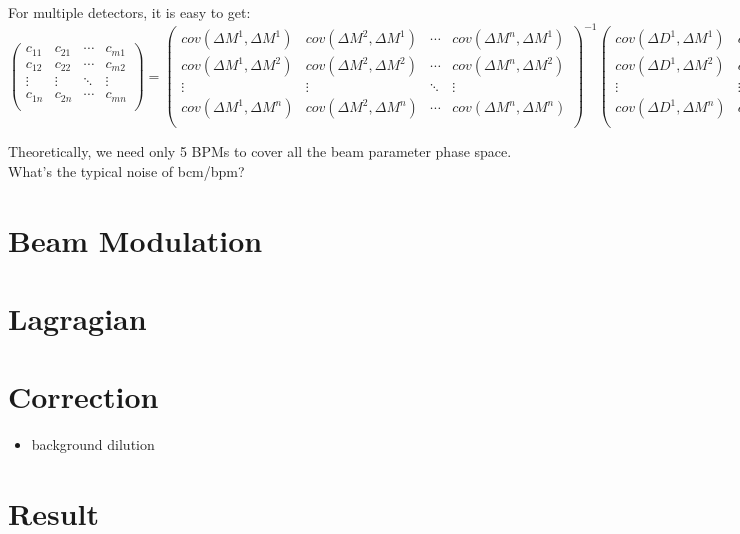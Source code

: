 For multiple detectors, it is easy to get:
\begin{equation}
    \begin{pmatrix}
	c_{11}	& c_{21}    & \cdots & c_{m1}	\\
	c_{12}	& c_{22}    & \cdots & c_{m2}	\\
	\vdots	& \vdots    & \ddots	& \vdots\\
	c_{1n}	& c_{2n}    & \cdots & c_{mn}	\\
    \end{pmatrix}
    =
    \begin{pmatrix}
	cov(\Delta M^1, \Delta M^1) & cov(\Delta M^2, \Delta M^1)   & \cdots & cov(\Delta M^n, \Delta M^1)  \\
	cov(\Delta M^1, \Delta M^2) & cov(\Delta M^2, \Delta M^2)   & \cdots & cov(\Delta M^n, \Delta M^2)  \\
	\vdots	& \vdots    & \ddots	& \vdots    \\
	cov(\Delta M^1, \Delta M^n) & cov(\Delta M^2, \Delta M^n)   & \cdots & cov(\Delta M^n, \Delta M^n)  \\
    \end{pmatrix}^{-1}
    \begin{pmatrix}
	cov(\Delta D^1, \Delta M^1) & cov(\Delta D^2, \Delta M^1)   & \cdots	& cov(\Delta D^m, \Delta M^1)	\\
	cov(\Delta D^1, \Delta M^2) & cov(\Delta D^2, \Delta M^2)   & \cdots	& cov(\Delta D^m, \Delta M^2)	\\
	\vdots	& \vdots    & \ddots	& \vdots    \\
	cov(\Delta D^1, \Delta M^n) & cov(\Delta D^2, \Delta M^n)   & \cdots	& cov(\Delta D^m, \Delta M^n)	\\
    \end{pmatrix}
\end{equation}

Theoretically, we need only 5 BPMs to cover all the beam parameter phase space.
What's the typical noise of bcm/bpm?



\section{Beam Modulation}

\section{Lagragian}

\section{Correction}
\begin{itemize}
    \item background dilution
\end{itemize}
\section{Result}
